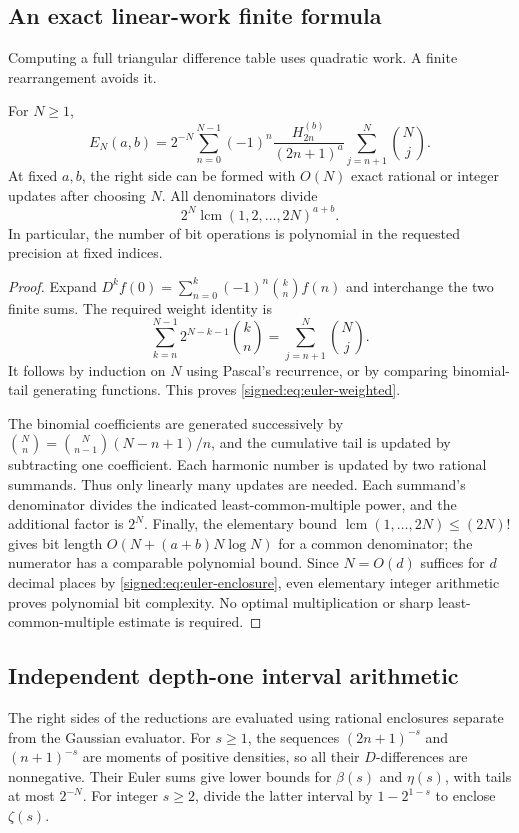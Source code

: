 \subsection{An exact linear-work finite formula}
Computing a full triangular difference table uses quadratic work. A finite rearrangement avoids it.

\begin{proposition}\label{signed:prop:euler-weights}
For $N\ge1$,
\begin{equation}\label{signed:eq:euler-weighted}
 E_N(a,b)=2^{-N}\sum_{n=0}^{N-1}(-1)^n
 \frac{H_{2n}^{(b)}}{(2n+1)^a}\sum_{j=n+1}^{N}\binom Nj.
\end{equation}
At fixed $a,b$, the right side can be formed with $O(N)$ exact rational or integer updates after choosing $N$. All denominators divide
\begin{equation}\label{signed:eq:denominator-bound}
 2^N\operatorname{lcm}(1,2,\ldots,2N)^{a+b}.
\end{equation}
In particular, the number of bit operations is polynomial in the requested precision at fixed indices.
\end{proposition}
\begin{proof}
Expand $D^kf(0)=\sum_{n=0}^k(-1)^n\binom kn f(n)$ and interchange the two finite sums. The required weight identity is
\[
 \sum_{k=n}^{N-1}2^{N-k-1}\binom kn
 =\sum_{j=n+1}^N\binom Nj.
\]
It follows by induction on $N$ using Pascal's recurrence, or by comparing binomial-tail generating functions. This proves \eqref{signed:eq:euler-weighted}.

The binomial coefficients are generated successively by
$\binom Nn=\binom N{n-1}(N-n+1)/n$, and the cumulative tail is updated by subtracting one coefficient. Each harmonic number is updated by two rational summands. Thus only linearly many updates are needed. Each summand's denominator divides the indicated least-common-multiple power, and the additional factor is $2^N$.
Finally, the elementary bound $\operatorname{lcm}(1,\ldots,2N)\le(2N)!$ gives bit length $O(N+(a+b)N\log N)$ for a common denominator; the numerator has a comparable polynomial bound. Since $N=O(d)$ suffices for $d$ decimal places by \eqref{signed:eq:euler-enclosure}, even elementary integer arithmetic proves polynomial bit complexity. No optimal multiplication or sharp least-common-multiple estimate is required.
\end{proof}

\subsection{Independent depth-one interval arithmetic}
The right sides of the reductions are evaluated using rational enclosures separate from the Gaussian evaluator. For $s\ge1$, the sequences $(2n+1)^{-s}$ and $(n+1)^{-s}$ are moments of positive densities, so all their $D$-differences are nonnegative. Their Euler sums give lower bounds for $\beta(s)$ and $\eta(s)$, with tails at most $2^{-N}$. For integer $s\ge2$, divide the latter interval by $1-2^{1-s}$ to enclose $\zeta(s)$.

